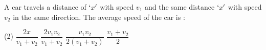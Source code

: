 \item A car travels a distance of $`x' $ with speed $v_1$ and the same distance $`x' $ with speed $v_2$ in the same direction. The average speed of the car is :
\begin{tasks}(2)
    \task $\dfrac{2x}{v_1 + v_2}$
    \task $\dfrac{2v_1v_2}{v_1 + v_2}$
    \task $\dfrac{v_1v_2}{2(v_1 + v_2)}$
    \task $\dfrac{v_1 + v_2}{2}$
\end{tasks}